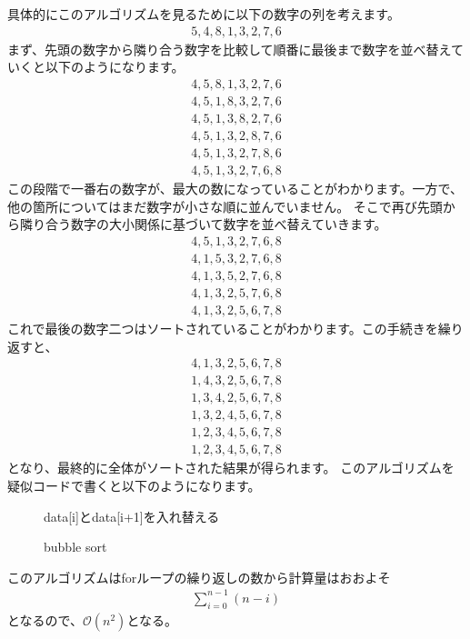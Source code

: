 \documentclass[dvipdfmx]{jarticle}
\begin{document}
具体的にこのアルゴリズムを見るために以下の数字の列を考えます。
\begin{eqnarray}\label{example init}
5, 4, 8, 1, 3, 2, 7, 6
\end{eqnarray}
まず、先頭の数字から隣り合う数字を比較して順番に最後まで数字を並べ替えていくと以下のようになります。
\begin{eqnarray}
4, 5, 8, 1, 3, 2, 7, 6\\
4, 5, 1, 8, 3, 2, 7, 6\\
4, 5, 1, 3, 8, 2, 7, 6\\
4, 5, 1, 3, 2, 8, 7, 6\\
4, 5, 1, 3, 2, 7, 8, 6\\
4, 5, 1, 3, 2, 7, 6, 8
\end{eqnarray}
この段階で一番右の数字が、最大の数になっていることがわかります。一方で、他の箇所についてはまだ数字が小さな順に並んでいません。
そこで再び先頭から隣り合う数字の大小関係に基づいて数字を並べ替えていきます。
\begin{eqnarray}
4, 5, 1, 3, 2, 7, 6, 8\\
4, 1, 5, 3, 2, 7, 6, 8\\
4, 1, 3, 5, 2, 7, 6, 8\\
4, 1, 3, 2, 5, 7, 6, 8\\
4, 1, 3, 2, 5, 6, 7, 8
\end{eqnarray}
これで最後の数字二つはソートされていることがわかります。この手続きを繰り返すと、
\begin{eqnarray}
4, 1, 3, 2, 5, 6, 7, 8\\
1, 4, 3, 2, 5, 6, 7, 8\\
1, 3, 4, 2, 5, 6, 7, 8\\
1, 3, 2, 4, 5, 6, 7, 8\\
1, 2, 3, 4, 5, 6, 7, 8\\
1, 2, 3, 4, 5, 6, 7, 8
\end{eqnarray}
となり、最終的に全体がソートされた結果が得られます。
このアルゴリズムを疑似コードで書くと以下のようになります。
\begin{figure}[H]
\begin{algorithm}[H]
	\caption{bubble sort}
	\label{bubble sort}
	\begin{algorithmic}[1]  
    	\STATE data[i]とdata[i+1]を入れ替える
	\ENDIF
	\ENDFOR
	\ENDFOR
	\end{algorithmic}
\end{algorithm}
\end{figure}
このアルゴリズムはforループの繰り返しの数から計算量はおおよそ
\begin{eqnarray}
\sum_{i=0}^{n-1}(n-i)
\end{eqnarray}
となるので、$\mathcal{O}(n^{2})$となる。
\end{document}
